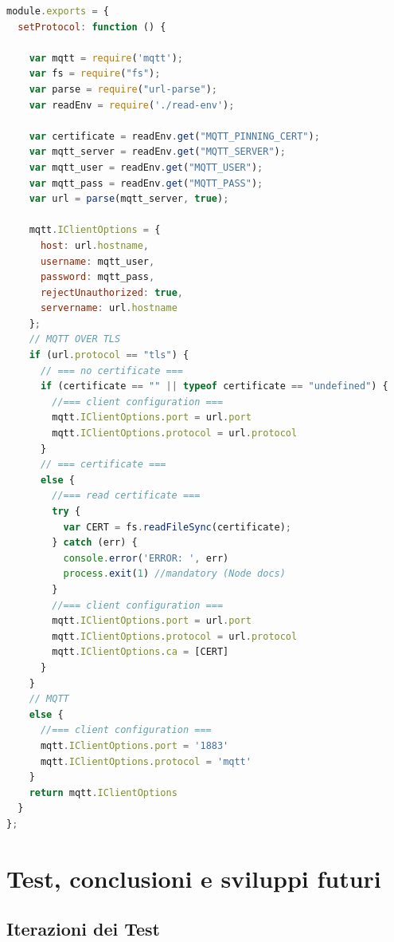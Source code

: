 \documentclass[a4paper,10pt]{memoir}
\begin{document}
\begin{lstlisting}[language=Javascript]
module.exports = {
  setProtocol: function () {

    var mqtt = require('mqtt');
    var fs = require("fs");
    var parse = require("url-parse");
    var readEnv = require('./read-env');

    var certificate = readEnv.get("MQTT_PINNING_CERT");
    var mqtt_server = readEnv.get("MQTT_SERVER");
    var mqtt_user = readEnv.get("MQTT_USER");
    var mqtt_pass = readEnv.get("MQTT_PASS");
    var url = parse(mqtt_server, true);

    mqtt.IClientOptions = {
      host: url.hostname,
      username: mqtt_user,
      password: mqtt_pass,
      rejectUnauthorized: true,
      servername: url.hostname
    };
    // MQTT OVER TLS
    if (url.protocol == "tls") {
      // === no certificate ===
      if (certificate == "" || typeof certificate == "undefined") {
        //=== client configuration ===
        mqtt.IClientOptions.port = url.port
        mqtt.IClientOptions.protocol = url.protocol
      }
      // === certificate ===
      else {
        //=== read certificate === 
        try {
          var CERT = fs.readFileSync(certificate);
        } catch (err) {
          console.error('ERROR: ', err)
          process.exit(1) //mandatory (Node docs)
        }
        //=== client configuration ===
        mqtt.IClientOptions.port = url.port
        mqtt.IClientOptions.protocol = url.protocol
        mqtt.IClientOptions.ca = [CERT]
      }
    }
    // MQTT
    else {
      //=== client configuration ===
      mqtt.IClientOptions.port = '1883'
      mqtt.IClientOptions.protocol = 'mqtt'
    }
    return mqtt.IClientOptions
  }
};

\end{lstlisting}

\clearpage


\chapter{Test, conclusioni e sviluppi futuri}

\section{Iterazioni dei Test}
\end{document}
